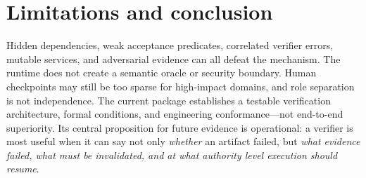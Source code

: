 \documentclass{article}
\begin{document}
\section{Limitations and conclusion}
Hidden dependencies, weak acceptance predicates, correlated verifier errors, mutable services, and adversarial evidence can all defeat the mechanism. The runtime does not create a semantic oracle or security boundary. Human checkpoints may still be too sparse for high-impact domains, and role separation is not independence. The current package establishes a testable verification architecture, formal conditions, and engineering conformance---not end-to-end superiority. Its central proposition for future evidence is operational: a verifier is most useful when it can say not only \emph{whether} an artifact failed, but \emph{what evidence failed, what must be invalidated, and at what authority level execution should resume}.



\end{document}
